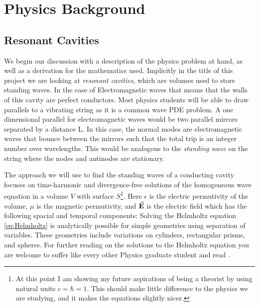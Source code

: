 \section{Physics Background}

\subsection{Resonant Cavities}
We begin our discussion with a description of the physics problem at hand, as well as a derivation for the mathematics used. Implicitly in the title of this project we are looking at \emph{resonant cavities}, which are volumes used to store standing waves. In the case of Electromagnetic waves that means that the walls of this cavity are perfect conductors. Most physics students will be able to draw parallels to a vibrating string as it is a common wave PDE problem. A one dimensional parallel for electromagnetic waves would be two parallel mirrors separated by a distance L. In this case, the normal modes are electromagnetic waves that bounce between the mirrors such that the total trip is an integer number over wavelengths\cite{Zangwill}. This would be analogous to the \emph{standing wave} on the string where the nodes and antinodes are stationary.

The approach we will use to find the standing waves of a conducting cavity focuses on time-harmonic and divergence-free solutions of the homogeneous wave equation in a volume $V$ with surface $S$\footnote{At this point I am showing my future aspirations of being a theorist by using natural units $c=\hbar=1$. This should make little difference to the physics we are studying, and it makes the equations slightly nicer.}.
Here $\epsilon$ is the electric permutivity of the volume, $\mu$ is the magnetic permutivity, and $\va{E}$ is the electric field which has the following spacial and temporal components:
Solving the Helmholtz equation \eqref{eq:Helmholtz} is analytically possible for simple geometries using separation of variables. These geometries include variations on cylinders, rectangular prisms, and spheres. For further reading on the solutions to the Helmholtz equation you are welcome to suffer like every other Physics graduate student and read \cite{Jackson}.

